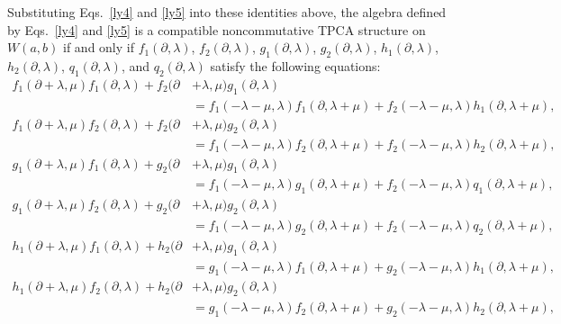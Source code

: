 \documentclass[11pt,letterpaper,reqno]{amsart}
\theoremstyle{definition}
\numberwithin{equation}{section}
\begin{document}
Substituting Eqs.~\eqref{ly4} and \eqref{ly5} into these identities above, the algebra defined by Eqs.~\eqref{ly4} and \eqref{ly5} is a compatible noncommutative TPCA structure on $W(a,b)$ if and only if
$f_1(\partial, \lambda)$, $f_2(\partial, \lambda)$, $g_1(\partial, \lambda)$, $g_2(\partial, \lambda)$,
$h_1(\partial, \lambda)$, $h_2(\partial, \lambda)$, $q_1(\partial, \lambda)$, and $q_2(\partial, \lambda)$ satisfy the following equations:
\begin{align}
f_1(\partial+\lambda, \mu)f_1(\partial, \lambda)+f_2(\partial&+\lambda, \mu)g_1(\partial, \lambda) \nonumber\\
&=f_1(-\lambda-\mu, \lambda)f_1(\partial, \lambda+\mu)+f_2(-\lambda-\mu, \lambda)h_1(\partial, \lambda+\mu),\label{yyy8}\\
f_1(\partial+\lambda, \mu)f_2(\partial, \lambda)+f_2(\partial&+\lambda, \mu)g_2(\partial, \lambda) \nonumber\\
&=f_1(-\lambda-\mu, \lambda)f_2(\partial, \lambda+\mu)+f_2(-\lambda-\mu, \lambda)h_2(\partial, \lambda+\mu),\label{yyy9}\\
g_1(\partial+\lambda, \mu)f_1(\partial, \lambda)+g_2(\partial&+\lambda, \mu)g_1(\partial, \lambda)\nonumber\\
&=f_1(-\lambda-\mu, \lambda)g_1(\partial, \lambda+\mu)+f_2(-\lambda-\mu, \lambda)q_1(\partial, \lambda+\mu),\label{yyy10}\\
g_1(\partial+\lambda, \mu)f_2(\partial, \lambda)+g_2(\partial&+\lambda, \mu)g_2(\partial, \lambda)\nonumber\\
&=f_1(-\lambda-\mu, \lambda)g_2(\partial, \lambda+\mu)+f_2(-\lambda-\mu, \lambda)q_2(\partial, \lambda+\mu),\label{yyy11}\\
h_1(\partial+\lambda, \mu)f_1(\partial, \lambda)+h_2(\partial&+\lambda, \mu)g_1(\partial, \lambda)\nonumber\\
&=g_1(-\lambda-\mu, \lambda)f_1(\partial, \lambda+\mu)+g_2(-\lambda-\mu, \lambda)h_1(\partial, \lambda+\mu),\label{yyy12}\\
h_1(\partial+\lambda, \mu)f_2(\partial, \lambda)+h_2(\partial&+\lambda, \mu)g_2(\partial, \lambda)\nonumber\\
&=g_1(-\lambda-\mu, \lambda)f_2(\partial, \lambda+\mu)+g_2(-\lambda-\mu, \lambda)h_2(\partial, \lambda+\mu),\label{yyy13}\\

\end{align}
\end{document}
